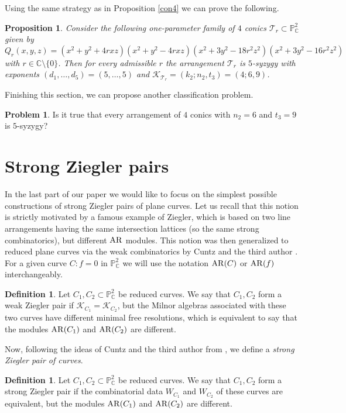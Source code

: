 \documentclass[11pt]{article}
\theoremstyle{plain}
\newtheorem{proposition}[thm]{Proposition}
\theoremstyle{definition}
\newtheorem{definition}[thm]{Definition}
\newtheorem{problem}[thm]{Problem}
\begin{document}
Using the same strategy as in Proposition \ref{con4} we can prove the following.
\begin{proposition}
Consider the following one-parameter family of $4$ conics $\mathcal{T}_{r} \subset \mathbb{P}^{2}_{\mathbb{C}}$ given by
$$Q_{r}(x,y,z) = (x^2+y^2+4rxz)(x^2+y^2-4rxz)(x^2+3y^2-18r^2z^2)(x^2+3y^2-16r^2z^2)$$
with $r \in \mathbb{C} \setminus \{0\}$. Then for every admissible $r$ the arrangement $\mathcal{T}_{r}$ is $5$-syzygy with exponents $(d_{1}, \ldots, d_{5}) = (5, \ldots, 5)$ and $\mathcal{K}_{\mathcal{T}_{r}}=(k_{2};n_{2},t_{3})=(4;6,9)$.
\end{proposition}
Finishing this section, we can propose another classification problem.
\begin{problem}
Is it true that every arrangement of $4$ conics with $n_{2}=6$ and $t_{3}=9$ is $5$-syzygy?
\end{problem}
\section{Strong Ziegler pairs}
In the last part of our paper we would like to focus on the simplest possible constructions of strong Ziegler pairs of plane curves. Let us recall that this notion is strictly motivated by a famous example of Ziegler, which is based on two line arrangements having the same intersection lattices (so the same strong combinatorics), but different ${\rm AR}$ modules. This notion was then generalized to reduced plane curves via the weak combinatorics by Cuntz and the third author \cite{CP}. For a given curve $C : f=0$ in $\mathbb{P}^{2}_{\mathbb{C}}$ we will use the notation ${\rm AR}(C)$ or ${\rm AR}(f)$ interchangeably.
\begin{definition}
Let $C_{1}, C_{2} \subset \mathbb{P}^{2}_{\mathbb{C}}$ be reduced curves. We say that $C_{1}, C_{2}$ form a weak Ziegler pair if $\mathcal{K}_{C_{1}} = \mathcal{K}_{C_{2}}$, but the Milnor algebras associated with these two curves have different minimal free resolutions, which is equivalent to say that the modules ${\rm AR}(C_{1})$ and ${\rm AR}(C_{2})$ are different.
\end{definition}
Now, following the ideas of Cuntz and the third author from \cite{CP}, we define a \textit{strong Ziegler pair of curves}.
\begin{definition}
Let $C_{1}, C_{2} \subset \mathbb{P}^{2}_{\mathbb{C}}$ be reduced curves. We say that $C_{1}, C_{2}$ form a strong Ziegler pair if the combinatorial data $W_{C_{1}}$ and $ W_{C_{2}}$ of these curves are equivalent, but the modules ${\rm AR}(C_{1})$ and ${\rm AR}(C_{2})$ are different.
\end{definition}
\end{document}
